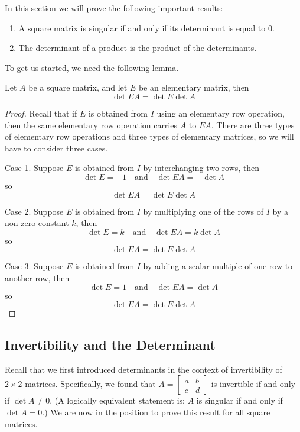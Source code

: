 \documentclass{ximera}
\begin{document}
 
In this section we will prove the following important results:
\begin{enumerate}
\item A square matrix is singular if and only if its determinant is equal to 0.
\item The determinant of a product is the product of the determinants.
\end{enumerate}
To get us started, we need the following lemma.
\begin{lemma}\label{lemma:detelemproduct} Let $A$ be a square matrix, and let $E$ be an elementary matrix, then
$$\det{EA}=\det{E}\det{A}$$
\end{lemma}
\begin{proof} Recall that if $E$ is obtained from $I$ using an elementary row operation, then the same elementary row operation carries $A$ to $EA$.  There are three types of elementary row operations and three types of elementary matrices, so we will have to consider three cases.
 
Case 1.  Suppose $E$ is obtained from $I$ by interchanging two rows, then
$$\det{E}=-1\quad\text{and}\quad \det{EA}=-\det{A}$$
so
$$\det{EA}=\det{E}\det{A}$$
 
Case 2.  Suppose $E$ is obtained from $I$ by multiplying one of the rows of $I$ by a non-zero constant $k$, then
$$\det{E}=k\quad\text{and}\quad \det{EA}=k\det{A}$$
so
$$\det{EA}=\det{E}\det{A}$$
 
Case 3.  Suppose $E$ is obtained from $I$ by adding a scalar multiple of one row to another row, then
$$\det{E}=1\quad\text{and}\quad \det{EA}=\det{A}$$
so
$$\det{EA}=\det{E}\det{A}$$
\end{proof}
\subsection*{Invertibility and the Determinant}
Recall that we first introduced determinants in the context of invertibility of $2\times 2$ matrices. Specifically, we found that $A=\begin{bmatrix}a&b\\c&d\end{bmatrix}$ is invertible if and only if $\det{A}\neq 0$.  (A logically equivalent statement is: $A$ is singular if and only if $\det{A}=0$.)   We are now in the position to prove this result for all square matrices.
 
\end{document}
